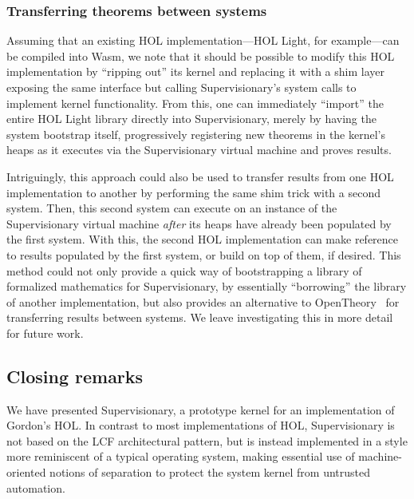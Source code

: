 \documentclass[a4paper, UKenglish, cleveref, autoref, thm-restate, colorlinks]{lipics-v2021}
\begin{document}
\subsubsection*{Transferring theorems between systems}

Assuming that an existing HOL implementation---HOL Light, for example---can be compiled into Wasm, we note that it should be possible to modify this HOL implementation by ``ripping out'' its kernel and replacing it with a shim layer exposing the same interface but calling Supervisionary's system calls to implement kernel functionality.
From this, one can immediately ``import'' the entire HOL Light library directly into Supervisionary, merely by having the system bootstrap itself, progressively registering new theorems in the kernel's heaps as it executes via the Supervisionary virtual machine and proves results.

Intriguingly, this approach could also be used to transfer results from one HOL implementation to another by performing the same shim trick with a second system.
Then, this second system can execute on an instance of the Supervisionary virtual machine \emph{after} its heaps have already been populated by the first system.
With this, the second HOL implementation can make reference to results populated by the first system, or build on top of them, if desired.
This method could not only provide a quick way of bootstrapping a library of formalized mathematics for Supervisionary, by essentially ``borrowing'' the library of another implementation, but also provides an alternative to OpenTheory~\cite{DBLP:conf/itp/KumarH12, DBLP:conf/nfm/Hurd11} for transferring results between systems.
We leave investigating this in more detail for future work.

\subsection{Closing remarks}

We have presented Supervisionary, a prototype kernel for an implementation of Gordon's HOL.
In contrast to most implementations of HOL, Supervisionary is not based on the LCF architectural pattern, but is instead implemented in a style more reminiscent of a typical operating system, making essential use of machine-oriented notions of separation to protect the system kernel from untrusted automation.
\end{document}
